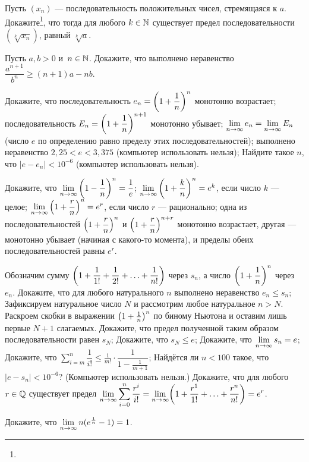 \documentclass[a4paper, 12pt]{article}
\begin{document}


\bigskip
{}
Пусть $(x_n)$ --- последовательность положительных чисел, стремящаяся к $a$.
Докажите\footnote{}, что тогда для любого $k\in\mathbb{N}$ существует предел последовательности $(\sqrt[k]{x_n})$,
равный $\sqrt[k]{a}$.


Пусть $a,b>0$ и~$n\in\mathbb{N}$.
Докажите, что выполнено неравенство $\dfrac{a^{n+1}}{b^n}\geqslant(n+1)a-nb$.

\label{eee}
Докажите, что
\smallskip
{}
последовательность $e_n = \left(1+\dfrac{1}n\right)^n$ монотонно возрастает;
\smallskip
{}
последовательность $E_n = \left(1+\dfrac{1}{n}\right)^{n+1}$ монотонно убывает;
\smallskip
{}
$\lim\limits_{n \rightarrow \infty} e_n = \lim\limits_{n \rightarrow \infty} E_n$
(число $e$ по определению равно пределу этих последовательностей);
\smallskip
{}
выполнено неравенство $2{,}25<e<3{,}375$ (компьютер использовать нельзя);
\medskip
{}
Найдите такое $n$, что $|e - e_n| < 10^{-6}$ (компьютер использовать нельзя).

Докажите, что
\smallskip
{}
$\lim\limits_{n \rightarrow \infty}\left(1-\dfrac1n\right)^n = \dfrac{1}{e}$;
\smallskip
{}
$\lim\limits_{n \rightarrow \infty}\left(1+\dfrac{k}{n}\right)^n = e^k$, если число $k$ --- целое;
{}
$\lim\limits_{n \rightarrow \infty}\left(1+\dfrac{r}{n}\right)^n = e^r$, если число $r$ --- рационально;
\smallskip
{}
одна из последовательностей $\left(1+\dfrac{r}{n}\right)^n$ и $\left(1+\dfrac{r}{n}\right)^{n+r}$ монотонно возрастает,
другая --- монотонно убывает (начиная с какого-то момента), и пределы обеих последовательностей равны $e^r$.

Обозначим сумму $\biggl( 1 + \dfrac{1}{1!} + \dfrac{1}{2!} + \ldots +  \dfrac{1}{n!}\biggr)$ через $s_n$,
а число $\left(1+\dfrac{1}n\right)^n$ через $e_n$.
\smallskip
{}
Докажите, что для любого натурального $n$ выполнено неравенство $e_n \le s_n$;
\smallskip
{}
Зафиксируем натуральное число $N$ и рассмотрим любое натуральное $n>N$.
Раскроем скобки в выражении $\left(1+\frac{1}n\right)^n$ по биному Ньютона
и оставим лишь первые $N+1$ слагаемых.
Докажите, что предел полученной таким образом последовательности равен $s_N$;
\smallskip
{}
Докажите, что $s_N \le e$;
\smallskip
{}
Докажите, что $\lim\limits_{n \rightarrow \infty} s_n = e$;
\smallskip
{}
Докажите, что
$\displaystyle\sum\limits_{i=m}^n \dfrac{1}{i!} \le \frac{1}{m!}\cdot\dfrac{1}{1-\frac{1}{m+1}}$;
\smallskip
{}
Найдётся ли $n < 100$ такое, что $|e - s_n| < 10^{-6}$? (Компьютер использовать нельзя.)
\smallskip
{}
Докажите, что для любого $r\in\mathbb{Q}$ существует предел
$\displaystyle
\lim\limits_{n \rightarrow \infty} \sum\limits_{i=0}^{n} \dfrac{r^i}{i!} =
\lim\limits_{n \rightarrow \infty} \biggl( 1 + \dfrac{r^1}{1!} + \ldots +  \dfrac{r^n}{n!}\biggr) = e^r
$.

Докажите, что $\lim\limits_{n \rightarrow \infty} n(e^{\frac{1}{n}} - 1) = 1$.

\end{document}
